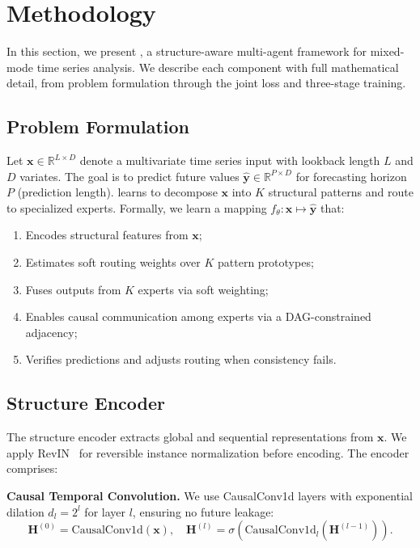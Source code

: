 \section{Methodology}

In this section, we present \model, a structure-aware multi-agent framework for mixed-mode time series analysis. We describe each component with full mathematical detail, from problem formulation through the joint loss and three-stage training.

\subsection{Problem Formulation}
\label{sec:problem}

Let $\mathbf{x} \in \mathbb{R}^{L \times D}$ denote a multivariate time series input with lookback length $L$ and $D$ variates. The goal is to predict future values $\hat{\mathbf{y}} \in \mathbb{R}^{P \times D}$ for forecasting horizon $P$ (prediction length). \model learns to decompose $\mathbf{x}$ into $K$ structural patterns and route to specialized experts. Formally, we learn a mapping $f_\theta: \mathbf{x} \mapsto \hat{\mathbf{y}}$ that:
\begin{enumerate}[leftmargin=*]
    \item Encodes structural features from $\mathbf{x}$;
    \item Estimates soft routing weights over $K$ pattern prototypes;
    \item Fuses outputs from $K$ experts via soft weighting;
    \item Enables causal communication among experts via a DAG-constrained adjacency;
    \item Verifies predictions and adjusts routing when consistency fails.
\end{enumerate}

\subsection{Structure Encoder}
\label{sec:encoder}

The structure encoder extracts global and sequential representations from $\mathbf{x}$. We apply RevIN~\cite{kim2022reversible} for reversible instance normalization before encoding. The encoder comprises:

\textbf{Causal Temporal Convolution.} We use CausalConv1d layers with exponential dilation $d_l = 2^l$ for layer $l$, ensuring no future leakage:
\begin{equation}
\mathbf{H}^{(0)} = \text{CausalConv1d}(\mathbf{x}), \quad \mathbf{H}^{(l)} = \sigma(\text{CausalConv1d}_l(\mathbf{H}^{(l-1)})).
\end{equation}

